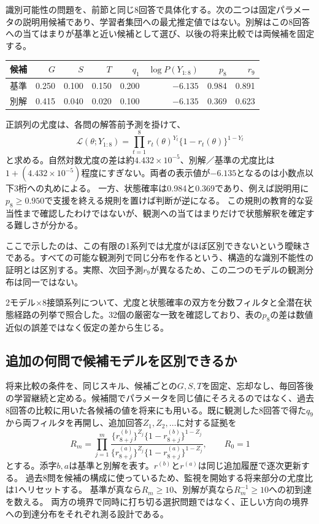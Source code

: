 \documentclass[11pt,a4paper]{article}
\numberwithin{equation}{section}
\begin{document}
識別可能性の問題\cite{ext2}を、前節と同じ8回答で具体化する。次の二つは固定パラメータの説明用候補であり、学習者集団への最尤推定値ではない。別解はこの8回答への当てはまりが基準と近い候補として選び、以後の将来比較では両候補を固定する。
\begin{center}\small
\begin{tabular}{lrrrrrrr}
\toprule
候補 & $G$ & $S$ & $T$ & $q_1$ & $\log P(Y_{1:8})$ & $p_8$ & $r_9$\\
\midrule
基準 & 0.250 & 0.100 & 0.150 & 0.200 & $-6.135$ & 0.984 & 0.891\\
別解 & 0.415 & 0.040 & 0.020 & 0.100 & $-6.135$ & 0.369 & 0.623\\
\bottomrule
\end{tabular}\end{center}
正誤列の尤度は、各問の解答前予測を掛けて、
\begin{equation}
\mathcal L(\theta;Y_{1:8})=\prod_{t=1}^8r_t(\theta)^{Y_t}\{1-r_t(\theta)\}^{1-Y_t}
\label{eq:bkt-likelihood}
\end{equation}
と求める。自然対数尤度の差は約$4.432\times10^{-5}$、別解／基準の尤度比は
$1+(4.432\times10^{-5})$程度にすぎない。両者の表示値が$-6.135$となるのは小数点以下3桁への丸めによる。
一方、状態確率は0.984と0.369であり、例えば説明用に$p_8\ge0.950$で支援を終える規則を置けば判断が逆になる。
この規則の教育的な妥当性まで確認したわけではないが、観測への当てはまりだけで状態解釈を確定する難しさが分かる。

ここで示したのは、この有限の1系列では尤度がほぼ区別できないという曖昧さである。すべての可能な観測列で同じ分布を作るという、構造的な識別不能性の証明とは区別する。実際、次回予測$r_9$が異なるため、この二つのモデルの観測分布は同一ではない。

2モデル×8接頭系列について、尤度と状態確率の双方を分数フィルタと全潜在状態経路の列挙で照合した。32個の厳密な一致を確認しており、表の$p_8$の差は数値近似の誤差ではなく仮定の差から生じる。

\subsection{追加の何問で候補モデルを区別できるか}\label{sec:bkt-future}

将来比較の条件を、同じスキル、候補ごとの$G,S,T$を固定、忘却なし、毎回答後の学習継続と定める。候補間でパラメータを同じ値にそろえるのではなく、過去8回答の比較に用いた各候補の値を将来にも用いる。既に観測した8回答で得た$q_9$から両フィルタを再開し、追加回答$Z_1,Z_2,\ldots$に対する証拠を
\begin{equation}
R_m=\prod_{j=1}^m
\frac{\{r^{(b)}_{8+j}\}^{Z_j}\{1-r^{(b)}_{8+j}\}^{1-Z_j}}
     {\{r^{(a)}_{8+j}\}^{Z_j}\{1-r^{(a)}_{8+j}\}^{1-Z_j}},\qquad R_0=1
\label{eq:bkt-future-LR}
\end{equation}
とする。添字$b,a$は基準と別解を表す。$r^{(b)}$と$r^{(a)}$は同じ追加履歴で逐次更新する。
過去8問を候補の構成に使っているため、監視を開始する将来部分の尤度比は1へリセットする。
基準が真なら$R_m\ge10$、別解が真なら$R_m^{-1}\ge10$への初到達を数える。
両方の境界で同時に打ち切る選択問題ではなく、正しい方向の境界への到達分布をそれぞれ測る設計である。
\end{document}
